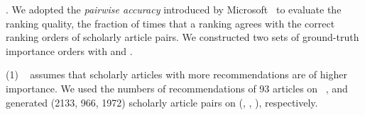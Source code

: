 
.
We adopted the {\em pairwise accuracy} introduced by Microsoft~\cite{Richardson06:BPR,wsdmcup} to evaluate the ranking quality,  the fraction of times that a ranking agrees with the correct ranking orders of scholarly article pairs. We constructed two sets of ground-truth importance orders with \recom and \fcita.
%

\noindent
(1) \recom~\cite{Liang16AAAI} assumes that scholarly articles with more recommendations are of higher importance.
We used the numbers of recommendations of 93 articles on \aan~\cite{Liang16AAAI}, %
and %
generated (2133, 966, 1972) scholarly article pairs on (\aan, \aminer, \magdata), respectively.


